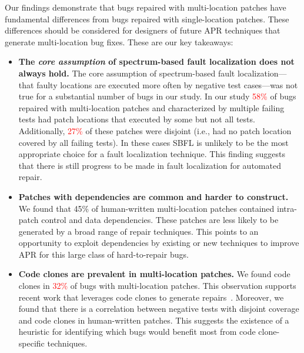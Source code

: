 \documentclass[10pt, conference]{IEEEtran}
\newcommand\todo[1]{\textcolor{red}{#1}}
\begin{document}
Our findings demonstrate that bugs repaired with multi-location patches have
fundamental differences from bugs repaired with single-location patches. These
differences should be considered for designers of future APR techniques that
generate multi-location bug fixes. These are our key takeaways:

\begin{itemize}[wide, labelindent=0pt]
\item \textbf{The \emph{core assumption} of spectrum-based fault
  localization does not always hold.}
The core assumption of spectrum-based fault localization---that faulty locations
are executed more often by negative test cases---was not true for a substantial
number of bugs in our study. In our study \todo{58\%} of bugs repaired with
multi-location patches and characterized by multiple failing tests had patch
locations that executed by some but not all tests. Additionally, \todo{27\%} of
these patches were disjoint (i.e., had no patch location covered by all failing
tests).  In these cases SBFL is unlikely to be the most appropriate choice for a
fault localization technique. This finding suggests that there is still progress
to be made in fault localization for automated repair.

\item \textbf{Patches with dependencies are common and harder to construct.}
We found that 45\% of human-written multi-location patches contained
intra-patch control and data dependencies. These patches are less likely to be
generated by a broad range of repair techniques. 
This points to an opportunity to exploit dependencies by
existing or new techniques to improve APR for this large class of hard-to-repair
bugs.

\item\textbf{Code clones are prevalent in multi-location patches.}
We found code clones in \todo{32\%} of bugs with multi-location
patches. This observation supports recent work that leverages code clones to
generate repairs~\cite{saha2019harnessing}. Moreover, we found that there is a
correlation between negative tests with disjoint coverage and code clones in
human-written patches. This suggests the existence of a heuristic for
identifying which bugs would benefit most from code clone-specific techniques.


\end{itemize}
\end{document}

